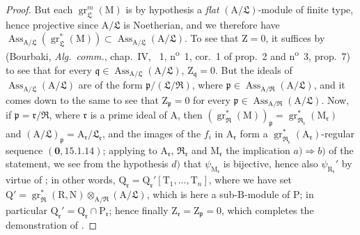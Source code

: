 \begin{proof}
But each $\operatorname{gr}_\mathfrak{L}^m(\mathrm{M})$ is by hypothesis a \emph{flat} $(\mathrm{A}/\mathfrak{L})$-module of finite type, hence projective since $\mathrm{A}/\mathfrak{L}$ is Noetherian, and we therefore have $\operatorname{Ass}_{\mathrm{A}/\mathfrak{L}}(\operatorname{gr}_\mathfrak{L}^*(\mathrm{M}))\subset\operatorname{Ass}_{\mathrm{A}/\mathfrak{L}}(\mathrm{A}/\mathfrak{L})$. To see that $\mathrm{Z}=0$, it suffices by (Bourbaki, \emph{Alg.~comm.}, chap.~IV, \textsection~1, n\textsuperscript{o}~1, cor.~1 of prop.~2 and n\textsuperscript{o}~3, prop.~7) to see that for every $\mathfrak{q}\in\operatorname{Ass}_{\mathrm{A}/\mathfrak{L}}(\mathrm{A}/\mathfrak{L})$, $\mathrm{Z}_\mathfrak{q}=0$. But the ideals of $\operatorname{Ass}_{\mathrm{A}/\mathfrak{L}}(\mathrm{A}/\mathfrak{L})$ are of the form $\mathfrak{p}/(\mathfrak{L}/\mathfrak{R})$, where $\mathfrak{p}\in\operatorname{Ass}_{\mathrm{A}/\mathfrak{R}}(\mathrm{A}/\mathfrak{L})$, and it comes down to the same to see that $\mathrm{Z}_\mathfrak{p}=0$ for every $\mathfrak{p}\in\operatorname{Ass}_{\mathrm{A}/\mathfrak{R}}(\mathrm{A}/\mathfrak{L})$. Now, if $\mathfrak{p}=\mathfrak{r}/\mathfrak{R}$, where $\mathfrak{r}$ is a prime ideal of $\mathrm{A}$, then $(\operatorname{gr}_\mathfrak{R}^*(\mathrm{M}))_\mathfrak{p}=\operatorname{gr}_{\mathfrak{R}_\mathfrak{r}}^*(\mathrm{M}_\mathfrak{r})$ and $(\mathrm{A}/\mathfrak{L})_\mathfrak{p}=\mathrm{A}_\mathfrak{r}/\mathfrak{L}_\mathfrak{r}$, and the images of the $f_i$ in $\mathrm{A}_\mathfrak{r}$ form a $\operatorname{gr}_{\mathfrak{R}_\mathfrak{r}}^*(\mathrm{A}_\mathfrak{r})$-regular sequence $(\mathbf{0},15.1.14)$; applying to $\mathrm{A}_\mathfrak{r}$, $\mathfrak{R}_\mathfrak{r}$ and $\mathrm{M}_\mathfrak{r}$ the implication $a)\Rightarrow b)$ of the statement, we see from the hypothesis $d)$ that $\psi_{\mathrm{M}_\mathfrak{r}}$ is bijective, hence also $\psi_{\mathrm{R}_\mathfrak{r}}'$ by virtue of ; in other words, $\mathrm{Q}_\mathfrak{r}=\mathrm{Q}_\mathfrak{r}'[\mathrm{T}_1,\ldots,\mathrm{T}_n]$, where we have set $\mathrm{Q}'=\operatorname{gr}_\mathfrak{R}^*(\mathrm{R},\mathrm{N})\otimes_{\mathrm{A}/\mathfrak{R}}(\mathrm{A}/\mathfrak{L})$, which is here a sub-$\mathrm{B}$-module of $\mathrm{P}$; in particular $\mathrm{Q}_\mathfrak{r}'=\mathrm{Q}_\mathfrak{r}\cap\mathrm{P}_\mathfrak{r}$; hence finally $\mathrm{Z}_\mathfrak{r}=\mathrm{Z}_\mathfrak{p}=0$, which completes the demonstration of .


\end{proof}
